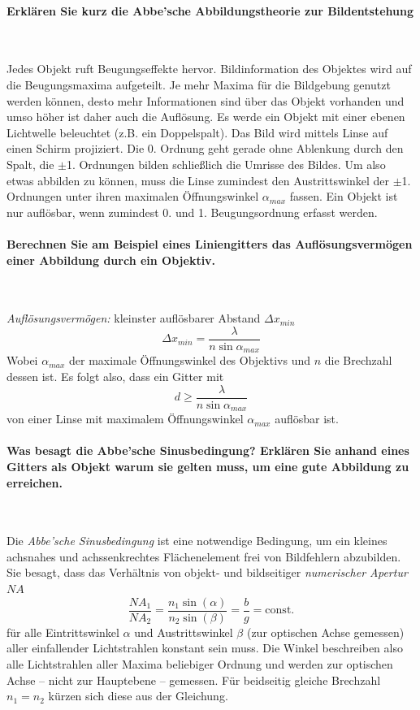 \documentclass[a4paper, 11pt, ngerman, parskip=half-]{scrartcl}
\newcommand{\NA}{\ensuremath{\mathit{NA}}}
\begin{document}
\paragraph{Erklären Sie kurz die Abbe'sche Abbildungstheorie zur Bildentstehung} ~

Jedes Objekt ruft Beugungseffekte hervor. Bildinformation des Objektes wird auf die Beugungsmaxima aufgeteilt. Je mehr Maxima für die Bildgebung genutzt werden
können, desto mehr Informationen sind über das Objekt vorhanden und umso höher ist daher auch die Auflösung. Es werde ein Objekt mit einer ebenen Lichtwelle
beleuchtet (z.B. ein Doppelspalt). Das Bild wird mittels Linse auf einen Schirm projiziert. Die 0. Ordnung geht gerade ohne Ablenkung durch den Spalt,
die $\pm$1. Ordnungen bilden schließlich die Umrisse des Bildes. Um also etwas abbilden zu können, muss die Linse zumindest den Austrittswinkel der $\pm$1.
Ordnungen unter ihren maximalen Öffnungswinkel $\alpha_{max}$ fassen. Ein Objekt ist nur auflösbar, wenn zumindest 0. und 1. Beugungsordnung erfasst werden.

\paragraph{Berechnen Sie am Beispiel eines Liniengitters das Auflösungsvermögen einer Abbildung
    durch ein Objektiv.} ~

\textit{Auflösungsvermögen:} kleinster auflösbarer Abstand $\Delta x_{min}$
\begin{equation}
    \Delta x_{min} = \frac{\lambda}{n \sin \alpha_{max}}
\end{equation}
Wobei $\alpha_{max}$ der maximale Öffnungswinkel des Objektivs und $n$ die Brechzahl dessen ist. Es folgt also, dass ein Gitter mit
\[d \geq \frac{\lambda}{n \sin \alpha_{max}}\]
von einer Linse mit maximalem Öffnungswinkel $\alpha_{max}$ auflösbar ist.

\paragraph{Was besagt die Abbe'sche Sinusbedingung? Erklären Sie anhand eines Gitters als Objekt
    warum sie gelten muss, um eine gute Abbildung zu erreichen.} ~

Die \textit{Abbe'sche Sinusbedingung} ist eine notwendige Bedingung, um ein kleines achsnahes und achssenkrechtes
Flächenelement frei von Bildfehlern abzubilden. Sie besagt, dass das Verhältnis von objekt- und bildseitiger \textit{numerischer Apertur $\NA$}
\begin{equation}
    \frac{\NA_1}{\NA_2} = \frac{n_1 \sin(\alpha)}{n_2 \sin(\beta)} = \frac{b}{g} = \text{const.}
\end{equation}
für alle Eintrittswinkel $\alpha$ und Austrittswinkel $\beta$ (zur optischen Achse gemessen) aller einfallender Lichtstrahlen konstant sein muss.
Die Winkel beschreiben also alle Lichtstrahlen aller Maxima beliebiger Ordnung und werden zur optischen Achse -- nicht zur Hauptebene -- gemessen.
Für beidseitig gleiche Brechzahl $n_1 = n_2$ kürzen sich diese aus der Gleichung.
\end{document}
